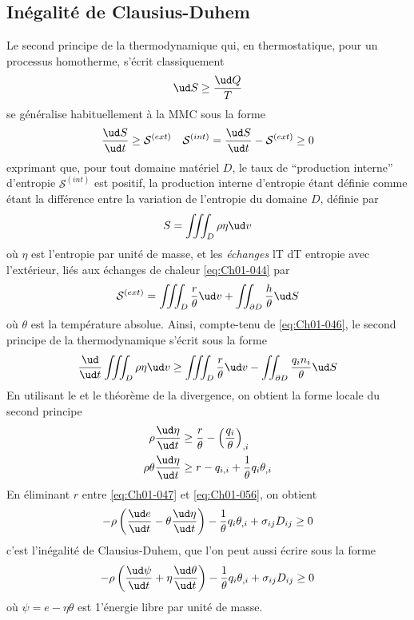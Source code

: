 \subsection{Inégalité de Clausius-Duhem} \label{ssec:Ch01-3.2}
Le second principe de la thermodynamique qui, en thermostatique, pour un processus homotherme, s'écrit classiquement
\begin{equation}
    \ud S \geq \frac{\ud Q}{T}
    \label{eq:Ch01-051}
\end{equation}
se généralise habituellement à la MMC sous la forme 
\begin{equation}
    \frac{\ud S}{\ud t} \geq \mathcal{S}^{(ext)} \quad \mathcal{S}^{(int)} = \frac{\ud S}{\ud t} - \mathcal{S}^{(ext)} \geq 0
    \label{eq:Ch01-052}
\end{equation}
exprimant que, pour tout domaine matériel $D$, le taux de ``production interne'' d'entropie $\mathcal{S}^{(int)}$ est positif, la production interne d'entropie étant définie comme étant la différence entre la variation de l'entropie du domaine $D$, définie par
\begin{equation}
    S = \iiint_{D} \rho \eta \ud v
    \label{eq:Ch01-053}
\end{equation}
où $\eta$ est l'entropie par unité de masse, et les \emph{échanges} lT dT entropie avec l'extérieur, liés aux échanges de chaleur \eqref{eq:Ch01-044} par
\begin{equation}
    \mathcal{S}^{(ext)} = \iiint_{D} \frac{r}{\theta} \ud v + \iint_{\partial D} \frac{h}{\theta} \ud S
    \label{eq:Ch01-054}
\end{equation}
où $\theta$ est la température absolue.
Ainsi, compte-tenu de \eqref{eq:Ch01-046}, le second principe de la thermodynamique s'écrit sous la forme
\begin{equation}
    \frac{\ud}{\ud t} \iiint_D \rho \eta \ud v \geq \iiint_{D} \frac{r}{\theta} \ud v - \iint_{\partial D} \frac{q_i n_i}{\theta} \ud S
    \label{eq:Ch01-055}
\end{equation}
En utilisant le  et le théorème de la divergence, on obtient la forme locale du second principe
\begin{align}
        \rho \frac{\ud \eta}{\ud t}  &\geq \frac{r}{\theta} - \left( \frac{q_i}{\theta} \right)_{,i} \nonumber\\
        \rho \theta \frac{\ud \eta}{\ud t}  &\geq r - q_{i,i} + \frac{1}{\theta} q_i\theta_{,i}
    \label{eq:Ch01-056}
\end{align}
En éliminant $r$ entre \eqref{eq:Ch01-047} et \eqref{eq:Ch01-056}, on obtient
\begin{equation}
    -\rho \left( \frac{\ud e}{\ud t} - \theta \frac{\ud \eta}{\ud t} \right) - \frac{1}{\theta}q_i \theta_{,i} + \sigma_{ij}D_{ij} \geq 0
    \label{eq:Ch01-057}
\end{equation}
c'est l'inégalité de Clausius-Duhem, que l'on peut aussi écrire sous la forme
\begin{equation}
    -\rho \left( \frac{\ud \psi}{\ud t} + \eta \frac{\ud \theta}{\ud t} \right) - \frac{1}{\theta}q_i \theta_{,i} + \sigma_{ij}D_{ij} \geq 0
    \label{eq:Ch01-058}
\end{equation}
où $\psi = e -\eta \theta$ est 1'énergie libre par unité de masse.

